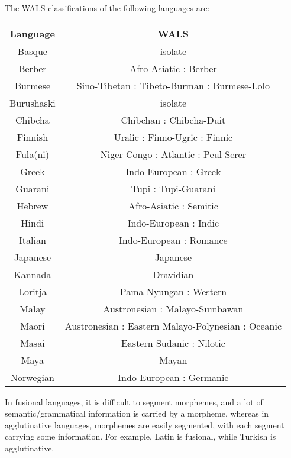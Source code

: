 \documentclass{article}
\begin{document}
\problem
The WALS classifications of the following languages are:
\begin{center}
    \begin{tabular}{|c|c|}
        \hline
        Language & WALS \\
        \hline
        Basque & isolate \\
        \hline
        Berber & Afro-Asiatic : Berber \\
        \hline
        Burmese & Sino-Tibetan : Tibeto-Burman : Burmese-Lolo \\
        \hline
        Burushaski & isolate \\
        \hline
        Chibcha & Chibchan : Chibcha-Duit \\
        \hline
        Finnish & Uralic : Finno-Ugric : Finnic \\
        \hline
        Fula(ni) & Niger-Congo : Atlantic : Peul-Serer \\
        \hline
        Greek & Indo-European : Greek \\
        \hline
        Guarani & Tupi : Tupi-Guarani \\
        \hline
        Hebrew & Afro-Asiatic : Semitic \\
        \hline
        Hindi & Indo-European : Indic \\
        \hline
        Italian & Indo-European : Romance\\
        \hline
        Japanese & Japanese \\
        \hline
        Kannada & Dravidian \\
        \hline
        Loritja & Pama-Nyungan : Western \\
        \hline
        Malay & Austronesian : Malayo-Sumbawan \\
        \hline
        Maori & Austronesian : Eastern Malayo-Polynesian : Oceanic \\
        \hline
        Masai & Eastern Sudanic : Nilotic \\
        \hline
        Maya & Mayan \\
        \hline
        Norwegian & Indo-European : Germanic \\
        \hline
    \end{tabular}
\end{center}

\clearpage

\problem
In fusional languages, it is difficult to segment morphemes, and a lot of semantic/grammatical information is carried by a morpheme, whereas in agglutinative languages, morphemes are easily segmented, with each segment carrying some information. For example, Latin is fusional, while Turkish is agglutinative.
\end{document}

